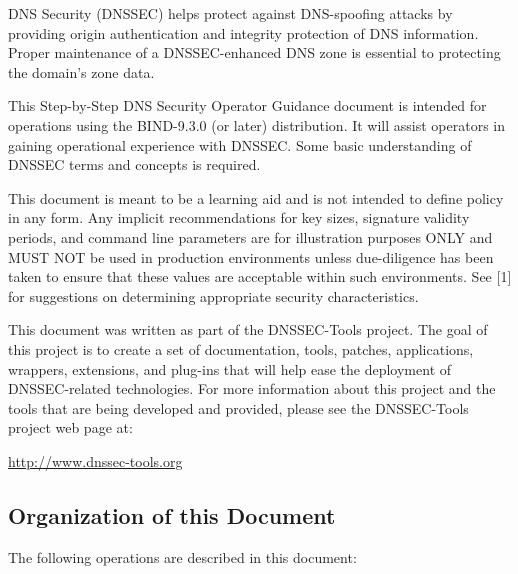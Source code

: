 
DNS Security (DNSSEC) helps protect against DNS-spoofing attacks by providing
origin authentication and integrity protection of DNS information.  Proper
maintenance of a DNSSEC-enhanced DNS zone is essential to protecting the
domain's zone data.


This Step-by-Step DNS Security Operator Guidance document is intended for
operations using the BIND-9.3.0 (or later) distribution.  It will assist
operators in gaining operational experience with DNSSEC. Some basic
understanding of DNSSEC terms and concepts is required.

This document is meant to be a learning aid and is not intended
to define policy in any form. Any implicit recommendations for key sizes,
signature validity periods, and command line parameters are for illustration
purposes ONLY and MUST NOT be used in production environments unless
due-diligence has been taken to ensure that these values are acceptable within
such environments.  See [1] for suggestions on determining appropriate
security characteristics.

This document was written as part of the DNSSEC-Tools project.  The goal of
this project is to create a set of documentation, tools, patches,
applications, wrappers, extensions, and plug-ins that will help ease the
deployment of DNSSEC-related technologies.  For more information about this
project and the tools that are being developed and provided, please see the
DNSSEC-Tools project web page at:

\url{http://www.dnssec-tools.org}


\subsection{Organization of this Document}

The following operations are described in this document:

